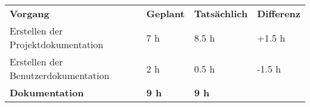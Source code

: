 \begin{tabular}{llll}
\rowcolor{heading}\textbf{Vorgang} & \textbf{Geplant} & \textbf{Tatsächlich} & \textbf{Differenz} \\
Erstellen der Projektdokumentation & 7 h   & 8.5 h  & +1.5 h \\
\rowcolor{odd}Erstellen der Benutzerdokumentation & 2 h   & 0.5 h   & -1.5 h \\
\hline
\hline
\rowcolor{heading}\textbf{Dokumentation} & \textbf{9 h} & \textbf{9 h} & \textbf{} \\
\end{tabular}
